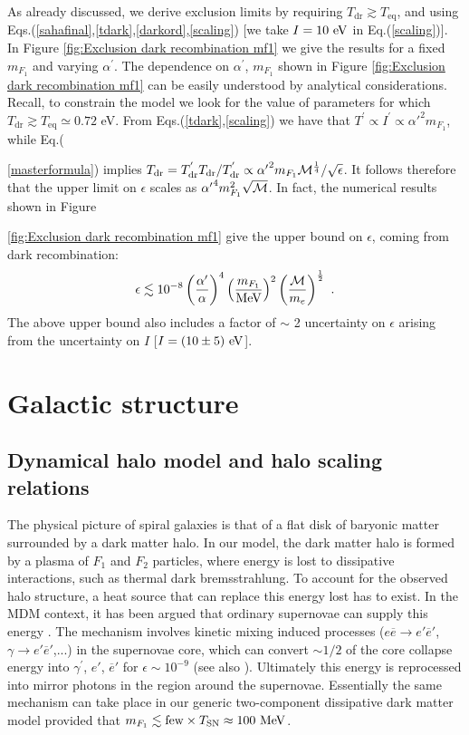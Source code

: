 \documentclass[12pt]{article}
\begin{document}
As already discussed, we derive exclusion limits by requiring $T _{\text{dr}} \gtrsim T _{\text{eq}}$, and using Eqs.(\ref{sahafinal},\ref{tdark},\ref{darkord},\ref{scaling}) [we take $I = 10 \ {\rm eV}$ in Eq.(\ref{scaling})]. In Figure \ref{fig:Exclusion dark recombination mf1} we give the results for a fixed $m _{F_1}$ and varying $\alpha ^{'}$. The dependence on $\alpha ^{'}$, $m _{F_1}$ shown in Figure \ref{fig:Exclusion dark recombination mf1} can be easily understood by analytical considerations. Recall, to constrain the model we look for the value of parameters for which $T _{\text{dr}} \gtrsim T _{\text{eq}} \simeq 0.72$ eV. From Eqs.(\ref{tdark},\ref{scaling}) we have that $T ^{'} \propto I ^{'} \propto {\alpha '} ^2 m _{F_1}$, while Eq.({\ref{masterformula}) implies $T _{\text{dr}} = T _{\text{dr}} ^{'}T _{\text{dr}}/T _{\text{dr}} ^{'} \propto {\alpha '} ^2m _{F_1}{\cal M} ^{\frac{1}{4}}/\sqrt{\epsilon}$. It follows therefore that the upper limit on $\epsilon$ scales as ${\alpha '} ^4 m _{F_1} ^2\sqrt{\cal M}$. In fact, the numerical results shown in Figure {\ref{fig:Exclusion dark recombination mf1} give the upper bound on $\epsilon$, coming from dark recombination:
%
\begin{eqnarray}
\epsilon \lesssim 10 ^{-8} \left ( \frac{\alpha '}{\alpha} \right ) ^4 \left ( \frac{m _{F_1}}{\rm MeV} \right ) ^2 \left ( \frac{{\cal M}}{m _e} \right ) ^{\frac{1}{2}} \ .
\label{boundse}
\end{eqnarray}
% 
The above upper bound also includes a factor of $\sim$ 2 uncertainty on $\epsilon$ arising from the uncertainty on $I$ [$I = (10 \pm 5) \ {\rm eV}$].

\section{Galactic structure}

\subsection{Dynamical halo model and halo scaling relations}

The physical picture of spiral galaxies is that of a flat disk of baryonic matter surrounded by a dark matter halo. In our model, the dark matter halo is formed by a plasma of $F _1$ and $F _2$ particles, where energy is lost to dissipative interactions, such as thermal dark bremsstrahlung. To account for the observed halo structure, a heat source that can replace this energy lost has to exist. In the MDM context, it has been argued that ordinary supernovae can supply this energy \cite{spheroidal,depth4,review}. The mechanism involves kinetic mixing induced processes ($e\overline{e} \rightarrow e'\overline{e}'$, $\gamma \rightarrow e'\overline{e}'$,...) in the supernovae core, which can convert $\sim 1/2$ of the core collapse energy into $\gamma ^{'}$, $e'$, $\overline{e}'$ for $\epsilon \sim 10 ^{-9}$ \cite{raf,updated} (see also \cite{silagadze}). Ultimately this energy is reprocessed into mirror photons in the region around the supernovae. Essentially the same mechanism can take place in our generic two-component dissipative dark matter model provided that $m _{F_1} \lesssim {\rm few} \times T _{\text{SN}} \approx 100 \ {\rm MeV}$.

}}
\end{document}

